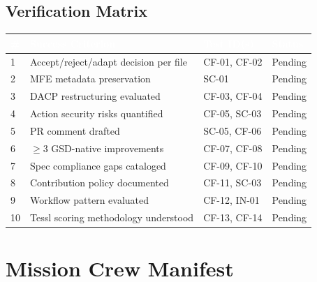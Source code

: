\documentclass[11pt,letterpaper]{article}
\newcommand{\tableheader}[1]{\textbf{\sffamily\textcolor{white}{#1}}}
\begin{document}
\subsection{Verification Matrix}

\begin{center}
\begin{tabularx}{\textwidth}{C{0.5cm}XL{2.5cm}C{1.5cm}}
\toprule
{}
\tableheader{\#} & \tableheader{Success Criterion} & \tableheader{Test ID(s)} & \tableheader{Status} \\
 & Accept/reject/adapt decision per file & CF-01, CF-02 & Pending \\
2 & MFE metadata preservation & SC-01 & Pending \\
3 & DACP restructuring evaluated & CF-03, CF-04 & Pending \\
4 & Action security risks quantified & CF-05, SC-03 & Pending \\
5 & PR comment drafted & SC-05, CF-06 & Pending \\
6 & $\geq$3 GSD-native improvements & CF-07, CF-08 & Pending \\
7 & Spec compliance gaps cataloged & CF-09, CF-10 & Pending \\
8 & Contribution policy documented & CF-11, SC-03 & Pending \\
9 & Workflow pattern evaluated & CF-12, IN-01 & Pending \\
10 & Tessl scoring methodology understood & CF-13, CF-14 & Pending \\
\bottomrule
\end{tabularx}
\end{center}

\section{Mission Crew Manifest}
\end{document}
